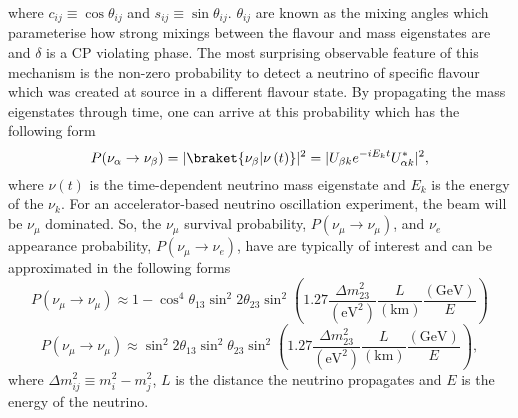 where $c_{ij} \equiv \cos\theta_{ij}$ and $s_{ij} \equiv \sin\theta_{ij}$. $\theta_{ij}$ are known as the mixing angles which parameterise how strong mixings between the flavour and mass eigenstates are and $\delta$ is a CP violating phase.  The most surprising observable feature of this mechanism is the non-zero probability to detect a neutrino of specific flavour which was created at source in a different flavour state.  By propagating the mass eigenstates through time, one can arrive at this probability which has the following form 
\begin{equation}
P(\nu_\alpha \rightarrow \nu_\beta) = |\braket{\nu_\beta|\nu\left(t\right)}|^2 = |U_{\beta k} e^{-iE_{k}t}  U^{\ast}_{\alpha k}|^2,
\label{eq:NeutrinoOscillationProbability}
\end{equation}
where $\nu\left(t\right)$ is the time-dependent neutrino mass eigenstate and $E_k$ is the energy of the $\nu_k$.  For an accelerator-based neutrino oscillation experiment, the beam will be $\nu_\mu$ dominated.  So, the $\nu_\mu$ survival probability, $P(\nu_\mu \rightarrow \nu_\mu)$, and $\nu_e$ appearance probability, $P(\nu_\mu \rightarrow \nu_e)$, have are typically of interest and can be approximated in the following forms
\begin{equation}
P(\nu_\mu \rightarrow \nu_\mu) \approx 1 - \cos^{4}\theta_{13}\sin^{2}2\theta_{23}\sin^2\left(1.27\frac{\Delta m^{2}_{23}}{\left(\textrm{eV}^2\right)}\frac{L}{\left(\textrm{km}\right)}\frac{\left(\textrm{GeV}\right)}{E}\right)
  \label{eq:MuonNeutrinoSurvivalProbability}
\end{equation}
\begin{equation}
P(\nu_\mu \rightarrow \nu_\mu) \approx \sin^{2}2\theta_{13}\sin^{2}\theta_{23}\sin^2\left(1.27\frac{\Delta m^{2}_{23}}{\left(\textrm{eV}^2\right)}\frac{L}{\left(\textrm{km}\right)}\frac{\left(\textrm{GeV}\right)}{E}\right),
  \label{eq:ElectronNeutrinoAppearanceProbability}
\end{equation}
where $\Delta m^{2}_{ij} \equiv m^{2}_{i} - m^{2}_{j}$, $L$ is the distance the neutrino propagates and $E$ is the energy of the neutrino.

